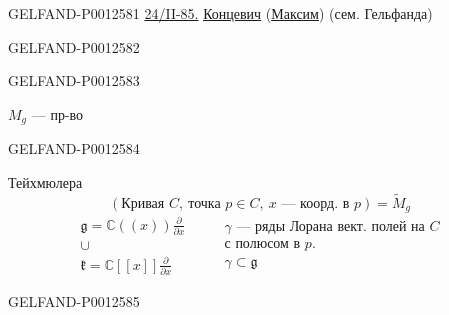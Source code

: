 \begin{GelfandAdjacentEvidence}{GELFAND-P001258}{1}
\underline{24/II-85.}\qquad
\underline{\underline{Концевич}} (\underline{Максим}) (сем. Гельфанда)
\end{GelfandAdjacentEvidence}
\begin{GelfandAdjacentEvidence}{GELFAND-P001258}{2}


\end{GelfandAdjacentEvidence}
\begin{GelfandAdjacentEvidence}{GELFAND-P001258}{3}

$M_g$ — пр-во
\end{GelfandAdjacentEvidence}
\begin{GelfandAdjacentEvidence}{GELFAND-P001258}{4}

Тейхмюлера
\begin{equation*}
(\text{Кривая }C,\ \text{точка }p\in C,\ x\text{ — коорд. в }p)
=\widetilde M_g
\end{equation*}
\begin{equation*}
\begin{gathered}
\mathfrak g=\mathbb C((x))\frac{\partial}{\partial x}\\
\cup\\
\mathfrak k=\mathbb C[[x]]\frac{\partial}{\partial x}
\end{gathered}
\qquad
\begin{gathered}
\gamma\text{ — ряды Лорана вект. полей на }C\\
\text{с полюсом в }p.\\
\gamma\subset\mathfrak g
\end{gathered}
\end{equation*}
\end{GelfandAdjacentEvidence}
\begin{GelfandAdjacentEvidence}{GELFAND-P001258}{5}

\end{GelfandAdjacentEvidence}
